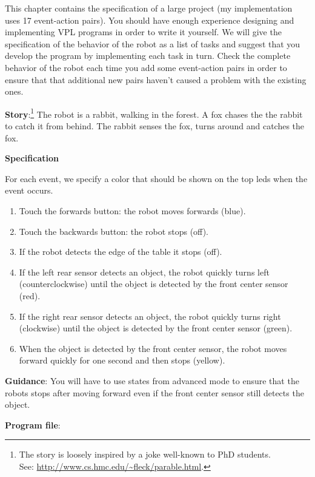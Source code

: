 
\label{ch.rabbit}

This chapter contains the specification of a large project (my
implementation uses 17 event-action pairs). You should have enough
experience designing and implementing VPL programs in order to write it
yourself. We will give the specification of the behavior of the robot as
a list of tasks and suggest that you develop the program by implementing
each task in turn. Check the complete behavior of the robot each time
you add some event-action pairs in order to ensure that that additional
new pairs haven't caused a problem with the existing ones.


\textbf{Story}:\footnote{The story is loosely inspired by a joke
well-known to PhD students.\\ See:
\url{http://www.cs.hmc.edu/~fleck/parable.html}.} The robot is a rabbit,
walking in the forest. A fox chases the the rabbit to catch
it from behind. The rabbit senses the fox, turns around and catches the
fox.


\textbf{Specification}

For each event, we specify a color that should be shown on the top leds
when the event occurs.

\begin{enumerate}
\item Touch the forwards button: the robot moves forwards (blue).
\item Touch the backwards button: the robot stops (off).
\item If the robot detects the edge of the table it stops (off).
\item If the left rear sensor detects an object, the robot quickly turns
left (counterclockwise) until the object is detected by the front center
sensor (red).
\item If the right rear sensor detects an object, the robot quickly turns
right (clockwise) until the object is detected by the front center
sensor (green).
\item When the object is detected by the front center sensor, the robot
moves forward quickly for one second and then stops (yellow).
\end{enumerate}

\textbf{Guidance}: You will have to use states from advanced mode to
ensure that the robots stops after moving forward even if the front
center sensor still detects the object.

\textbf{Program file}: 
